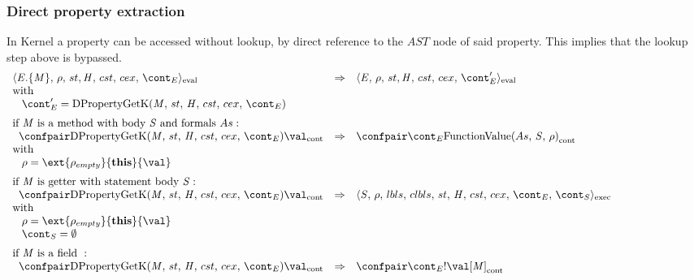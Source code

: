 \documentclass{article}
\begin{document}
\subsubsection{Direct property extraction}
\label{subsubsec:direct-property-extraction}
In Kernel a property can be accessed without lookup, by direct reference to the $AST$ node of said property. This implies that the lookup step above is bypassed.
\newcommand{\dpropertygetk}{\mathrm{DPropertyGetK}(\membermeta,\,\strace,\,\handler,\,\cstrace,\,\cex,\,\econt)}
\[
  \begin{array}{lcl@{\hspace{30mm}}}
	\cesktrans{
		\evalconf{\DirectPropertyGet{\expressionmeta}{\membermeta}}{\env}{\strace}{\cstrace}{\cex}{\econt}}{
		\evalconf{\expressionmeta}{\env}{\strace}{\cstrace}{\cex}{\econt'}}\\
	\textrm{with}\\
	\hspace{3mm}
	\econt' = \dpropertygetk\\[2mm]

	\textrm{if }\membermeta \textrm{ is a method with body }\stmt\textrm{ and formals }\formals :\\
	\hspace{2mm}
	\cesktrans{
		\contconf{\dpropertygetk}{\val}}{
		\contconf{\econt}{\funval{\formals}{\stmt}{\env}}}\\
	\textrm{with}\\
	\hspace{3mm}
	\env = \ext{\env_{empty}}{\mathbf{this}}{\val}\\[2mm]

	\textrm{if }\membermeta \textrm{ is getter with statement body }\stmt :\\
	\hspace{2mm}
	\cesktrans{
		\contconf{\dpropertygetk}{\val}}{
		\execconf{\stmt}{\env}{\lbls}{\clbls}{\handler}{\cstrace}{\cex}{\econt}{\scont}}
		\\
	\textrm{with}\\
	\hspace{3mm}
	\env = \ext{\env_{empty}}{\mathbf{this}}{\val}\\
	\hspace{3mm}
	\scont = \emptyset\\[2mm]

	\textrm{if }\membermeta \textrm{ is a field } :\\
	\hspace{2mm}\cesktrans{
		\contconf{\dpropertygetk}{\val}}{
		\contconf{\econt}{\deref{\val[\membermeta]}}}\\
  \end{array}
\]
\end{document}
